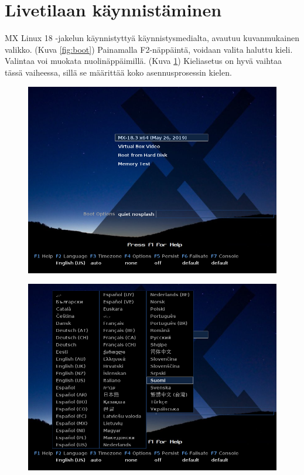 \documentclass[a4paper, 12pt, finnish]{article}
\begin{document}
\section{Livetilaan käynnistäminen}
MX Linux 18 -jakelun käynnistyttyä käynnistysmedialta, avautuu kuvanmukainen valikko. (Kuva \ref{fig:boot})
Painamalla F2-näppäintä, voidaan valita haluttu kieli. Valintaa voi muokata nuolinäppäimillä. (Kuva \ref{fig:lang}) Kieliasetus on hyvä vaihtaa tässä vaiheessa, sillä se määrittää koko asennusprosessin kielen.

\begin{figure}[htbp]
     \centering
      \begin{minipage}{.5\textwidth}
           \centering
            \includegraphics[width=.98\linewidth]{asen/boot}
              \label{fig:boot}
               \end{minipage}%
               \begin{minipage}{.5\textwidth}
                    \centering
                     \includegraphics[width=.98\linewidth]{asen/lang}
                       \label{fig:lang}
                        \end{minipage}
                         \end{figure}
\end{document}
